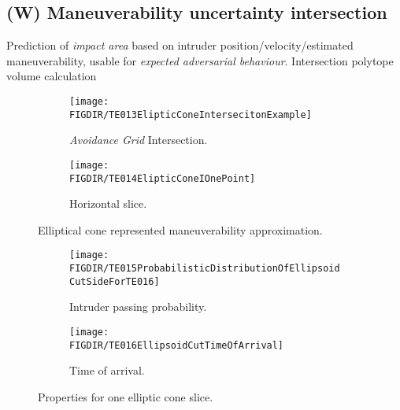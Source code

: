 \subsection{(W) Maneuverability uncertainty intersection}\label{s:uncertaintyIntersection}
    \noindent Prediction of \emph{impact area} based on intruder position/velocity/estimated maneuverability, usable for \emph{expected adversarial behaviour}. Intersection polytope volume calculation \cite{lawrence1991polytope}
    
    \begin{figure}[H]
    	\centering
        \begin{subfigure}{0.48\textwidth}
            \texttt{[image: \\FIGDIR/TE013ElipticConeIntersecitonExample]}
            \caption{\emph{Avoidance Grid} Intersection.}
            \label{fig:ellipticConeIntersectionExample}
        \end{subfigure}
        \begin{subfigure}{0.48\textwidth}
            \texttt{[image: \\FIGDIR/TE014ElipticConeIOnePoint]} 
            \caption{Horizontal slice.}
            \label{fig:ellipticalConeHorizontalSlice}
        \end{subfigure}
        \caption{Elliptical cone represented maneuverability approximation. }
        \label{fig:ellipticalConeRepresentedManuevurabilityApproximation}
    \end{figure}
    
    \begin{figure}[H]
    	\centering
        \begin{subfigure}{0.48\textwidth}
            \texttt{[image: \\FIGDIR/TE015ProbabilisticDistributionOfEllipsoidCutSideForTE016]}
            \caption{Intruder passing probability.}
            \label{fig:intruderPassingProbability}
        \end{subfigure}
        \begin{subfigure}{0.48\textwidth}
            \texttt{[image: \\FIGDIR/TE016EllipsoidCutTimeOfArrival]} 
            \caption{Time of arrival.}
            \label{fig:intruderTimeOfArrival}
        \end{subfigure}
        \caption{Properties for one elliptic cone slice. }
        \label{fig:propertiesEllipticConeSlice}
    \end{figure}

